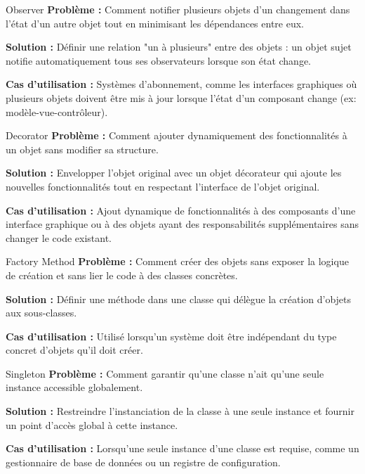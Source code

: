 \documentclass[aspectratio=169]{beamer}
\begin{document}
\begin{frame}{Observer}
    \textbf{Problème :} 
    Comment notifier plusieurs objets d'un changement dans l'état d'un autre objet tout en minimisant les dépendances entre eux.

    \textbf{Solution :} 
    Définir une relation "un à plusieurs" entre des objets : un objet sujet notifie automatiquement tous ses observateurs lorsque son état change.

    \textbf{Cas d'utilisation :}
    Systèmes d'abonnement, comme les interfaces graphiques où plusieurs objets doivent être mis à jour lorsque l'état d'un composant change (ex: modèle-vue-contrôleur).
\end{frame}

\begin{frame}{Decorator}
    \textbf{Problème :} 
    Comment ajouter dynamiquement des fonctionnalités à un objet sans modifier sa structure.

    \textbf{Solution :} 
    Envelopper l'objet original avec un objet décorateur qui ajoute les nouvelles fonctionnalités tout en respectant l'interface de l'objet original.

    \textbf{Cas d'utilisation :}
    Ajout dynamique de fonctionnalités à des composants d'une interface graphique ou à des objets ayant des responsabilités supplémentaires sans changer le code existant.
\end{frame}

\begin{frame}{Factory Method}
    \textbf{Problème :} 
    Comment créer des objets sans exposer la logique de création et sans lier le code à des classes concrètes.

    \textbf{Solution :} 
    Définir une méthode dans une classe qui délègue la création d'objets aux sous-classes.

    \textbf{Cas d'utilisation :}
    Utilisé lorsqu'un système doit être indépendant du type concret d'objets qu'il doit créer.
\end{frame}

\begin{frame}{Singleton}
    \textbf{Problème :} 
    Comment garantir qu'une classe n'ait qu'une seule instance accessible globalement.

    \textbf{Solution :} 
    Restreindre l'instanciation de la classe à une seule instance et fournir un point d'accès global à cette instance.

    \textbf{Cas d'utilisation :}
    Lorsqu'une seule instance d'une classe est requise, comme un gestionnaire de base de données ou un registre de configuration.
\end{frame}
\end{document}
